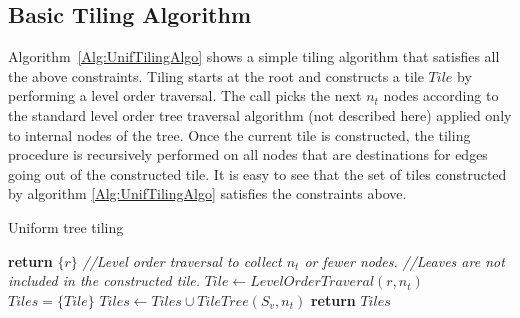 \subsection{Basic Tiling Algorithm}
\label{sec:UnifTiling}
Algorithm~\ref{Alg:UnifTilingAlgo} shows a simple tiling algorithm that satisfies all the above constraints. 
Tiling starts at the root and constructs a tile $Tile$ by performing
a level order traversal. The call  picks the next $n_t$ nodes according to the standard level order tree traversal algorithm (not described here) applied only to internal nodes of the tree. Once the current tile is constructed, the tiling procedure is recursively performed on all nodes that are 
destinations for edges going out of the constructed tile.
It is easy to see that the set of tiles constructed by algorithm \ref{Alg:UnifTilingAlgo} satisfies the constraints above.
\begin{algorithm}
  \caption{Uniform tree tiling}
  \label{Alg:UnifTilingAlgo}
  \begin{algorithmic}
              \State \textbf{return} $\{ r \}$
          \EndIf
          \State \textcolor{codegreen}{\textit{//Level order traversal to collect $n_t$ or fewer nodes. }}
          \State \textcolor{codegreen}{\textit{//Leaves are not included in the constructed tile. }}
          \State $Tile \leftarrow LevelOrderTraveral(r, n_t)$
          \State $Tiles =  \{ Tile \}$
              \State $Tiles \leftarrow Tiles \cup TileTree(S_v, n_t)$
          \EndFor
          \State \textbf{return} $Tiles$
      \EndProcedure
  \end{algorithmic}
\end{algorithm}

